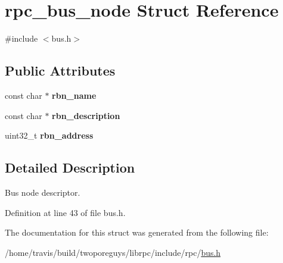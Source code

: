 \hypertarget{structrpc__bus__node}{\section{rpc\-\_\-bus\-\_\-node Struct Reference}
\label{structrpc__bus__node}
}


{\ttfamily \#include $<$bus.\-h$>$}

\subsection*{Public Attributes}
\begin{DoxyCompactItemize}
\item 
\hypertarget{structrpc__bus__node_a7fa4491eff39bb96c779b4208ca388ec}{const char $\ast$ {\bfseries rbn\-\_\-name}}\label{structrpc__bus__node_a7fa4491eff39bb96c779b4208ca388ec}

\item 
\hypertarget{structrpc__bus__node_aa7eab44be63bee011e2b7589a092a3ab}{const char $\ast$ {\bfseries rbn\-\_\-description}}\label{structrpc__bus__node_aa7eab44be63bee011e2b7589a092a3ab}

\item 
\hypertarget{structrpc__bus__node_a624e2a0be665938924ab2f815afb669e}{uint32\-\_\-t {\bfseries rbn\-\_\-address}}\label{structrpc__bus__node_a624e2a0be665938924ab2f815afb669e}

\end{DoxyCompactItemize}


\subsection{Detailed Description}
Bus node descriptor. 

Definition at line 43 of file bus.\-h.



The documentation for this struct was generated from the following file\-:\begin{DoxyCompactItemize}
\item 
/home/travis/build/twoporeguys/librpc/include/rpc/\hyperlink{bus_8h}{bus.\-h}\end{DoxyCompactItemize}
